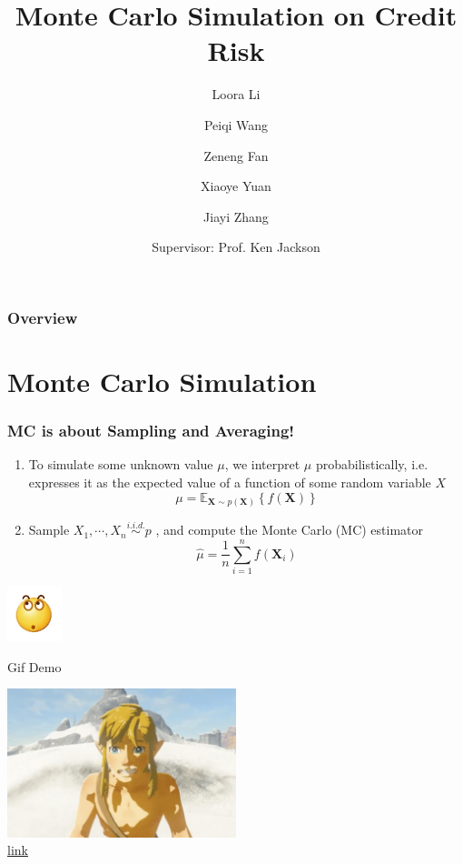 \documentclass{beamer}
\title[]{Monte Carlo Simulation on Credit Risk}
\author[Loora, Peiqi]{Loora Li \and Peiqi Wang \and Zeneng Fan \and Xiaoye Yuan \and Jiayi Zhang}
\date[July 5th, 2018]{Supervisor: Prof. Ken Jackson }
\newcommand{\matr}[1]{\mathbf{#1}}
\newcommand{\E}[2][]{\mathbb{E}_{#1}\left\{#2\right\}}
\newcommand{\bX}{\matr{X}}
\begin{document}
\frame{\titlepage}
\begin{frame}
    \frametitle{Overview}
    \tableofcontents
\end{frame}


\section{Monte Carlo Simulation}


\begin{frame}
\frametitle{MC is about Sampling and Averaging!}
\begin{enumerate} 
    \item To simulate some unknown value $\mu$, we interpret $\mu$ probabilistically, i.e. expresses it as the expected value of a function of some random variable $X$
    \[
        \mu = \E[\bX \sim p(\bX)]{f(\bX)}
    \]
    \item Sample $X_1, \cdots, X_n \overset{i.i.d.}{\sim} p$ , and compute the Monte Carlo (MC) estimator
    \[
        \hat{\mu} = \frac{1}{n} \sum_{i=1}^n f(\bX_i)
    \]
\end{enumerate}    
\begin{center}
    \includegraphics{slight.png}
\end{center}
\end{frame}

\begin{frame}{Gif Demo} 
\begin{center}
    \includegraphics[width=0.5\textwidth]{link_shaking.png} \\ 
    \href{https://en.wikipedia.org/wiki/Monte_Carlo_method}{link} \\    
\end{center}
\end{frame}
\end{document}
